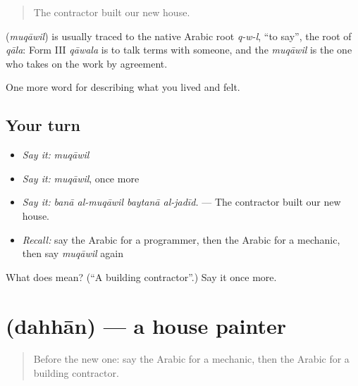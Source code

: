 \begin{quote}
The contractor built our new house.
\end{quote}

\begin{cousinweb}
\textbf{} (\emph{muqāwil}) is usually traced to the native Arabic root \emph{q-w-l}, \textquotedblleft{}to say\textquotedblright{}, the root of \emph{qāla}: Form III \emph{qāwala} is to talk terms with someone, and the \emph{muqāwil} is the one who takes on the work by agreement.
\end{cousinweb}

\begin{grammarlens}[title={What you've built}]
One more word for describing what you lived and felt.
\end{grammarlens}

\subsection*{Your turn}
\begin{itemize}
\raggedright
  \item \emph{Say it:} \emph{muqāwil}
  \item \emph{Say it:} \emph{muqāwil}, once more
  \item \emph{Say it:} \emph{banā al-muqāwil baytanā al-jadīd.} — The contractor built our new house.
  \item \emph{Recall:} say the Arabic for a programmer, then the Arabic for a mechanic, then say \emph{muqāwil} again
\end{itemize}

\begin{tcolorbox}[breakable,colback=teal!4,colframe=teal!35!black,title={Before you move on}]
What does  mean? (\textquotedblleft{}A building contractor\textquotedblright{}.) Say it once more.
\end{tcolorbox}
\section[\texorpdfstring{\ar{دهان} (dahhān)}{دهان (dahhān)}]{ (dahhān) — a house painter}

\label{lesson:AR-C526-dahhan}



\begin{quote}
Before the new one: say the Arabic for a mechanic, then the Arabic for a building contractor.
\end{quote}

